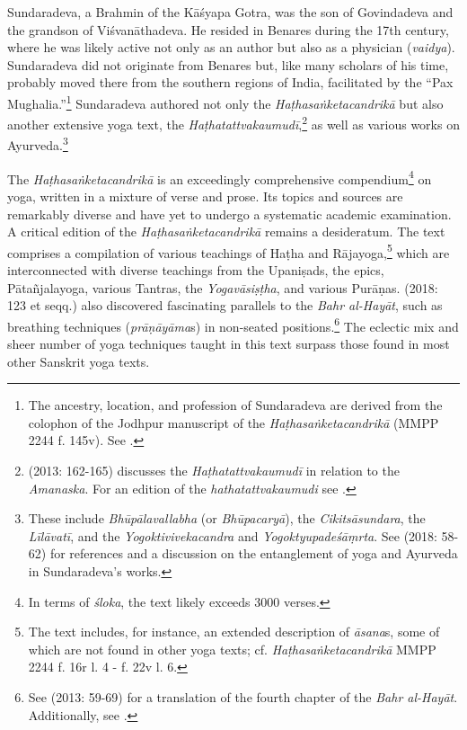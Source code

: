 Sundaradeva, a Brahmin of the Kāśyapa Gotra, was the son of Govindadeva and the grandson of Viśvanāthadeva. He resided in Benares during the 17th century, where he was likely active not only as an author but also as a physician (\textit{vaidya}). Sundaradeva did not originate from Benares but, like many scholars of his time, probably moved there from the southern regions of India, facilitated by the ``Pax Mughalia.''\footnote{The ancestry, location, and profession of Sundaradeva are derived from the colophon of the Jodhpur manuscript of the \emph{Haṭhasaṅketacandrikā} (MMPP 2244 f. 145v). See \citeauthor[2018: 123]{birch2018proliferation}.} Sundaradeva authored not only the \emph{Haṭhasaṅketacandrikā} but also another extensive yoga text, the \emph{Haṭhatattvakaumudī},\footnote{\citeauthor{birch2013} (2013: 162-165) discusses the \emph{Haṭhatattvakaumudī} in relation to the \emph{Amanaska}. For an edition of the \emph{hathatattvakaumudi} see \cite{hathatattvakaumudi}.} as well as various works on Ayurveda.\footnote{These include \emph{Bhūpālavallabha} (or \emph{Bhūpacaryā}), the \emph{Cikitsāsundara}, the \emph{Līlāvatī}, and the \emph{Yogoktivivekacandra} and \emph{Yogoktyupadeśāṃrta}. See \citeauthor{birch2018ayur} (2018: 58-62) for references and a discussion on the entanglement of yoga and Ayurveda in Sundaradeva's works.}

The \emph{Haṭhasaṅketacandrikā} is an exceedingly comprehensive compendium\footnote{In terms of \textit{śloka}, the text likely exceeds 3000 verses.} on yoga, written in a mixture of verse and prose. Its topics and sources are remarkably diverse and have yet to undergo a systematic academic examination. A critical edition of the \emph{Haṭhasaṅketacandrikā} remains a desideratum. The text comprises a compilation of various teachings of Haṭha and Rājayoga,\footnote{The text includes, for instance, an extended description of \emph{āsana}s, some of which are not found in other yoga texts; cf. \emph{Haṭhasaṅketacandrikā} MMPP 2244 f. 16r l. 4 - f. 22v l. 6.} which are interconnected with diverse teachings from the Upaniṣads, the epics, Pātañjalayoga, various Tantras, the \emph{Yogavāsiṣṭha}, and various Purāṇas. \citeauthor{birch2018proliferation} (2018: 123 et seqq.) also discovered fascinating parallels to the \emph{Bahr al-Hayāt}, such as breathing techniques (\textit{prāṇāyāma}s) in non-seated positions.\footnote{See \citeauthor{ernst2013} (2013: 59-69) for a translation of the fourth chapter of the \emph{Bahr al-Hayāt}. Additionally, see \citeauthor[2003]{ernst2003}.} The eclectic mix and sheer number of yoga techniques taught in this text surpass those found in most other Sanskrit yoga texts.

